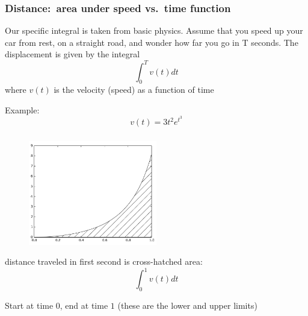 \documentclass[english,14pt]{beamer}
\begin{document}
\begin{frame}[fragile]

\frametitle{Distance:~area under speed vs.~time function}

Our specific integral is taken from basic physics. Assume that you speed up your car from rest, on a straight road, and wonder how far you go in T seconds. The displacement is given by the integral
\[
\int_0^T v(t)dt
\]
where $v(t)$ is the velocity (speed) as a function of time

Example:
\[
v(t) = 3t^2e^{t^3}
\]

\end{frame}


\begin{frame}[fragile]

\frametitle{}

\begin{figure}[ht]
	\centering
	\includegraphics[width=0.5\textwidth]{figures/LLp134}
\end{figure}

distance traveled in first second is cross-hatched area:
\[
\int_0^1 v(t)dt
\]

Start at time $0$, end at time $1$ (these are the lower and upper limits)
\end{frame}

\end{document}
